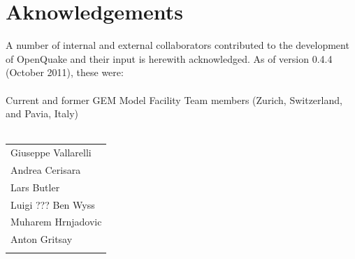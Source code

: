\chapter*{Aknowledgements}
A number of internal and external collaborators contributed to 
the development of OpenQuake and their input is herewith acknowledged. 
As of version 0.4.4 (October 2011), these were: \hfill \\
\hfill \\
Current and former GEM Model Facility Team members (Zurich, Switzerland,
and Pavia, Italy) \hfill \\
\hfill \\
\begin{tabular}{l}
Giuseppe Vallarelli \\
Andrea Cerisara \\
Lars Butler \\

Luigi ???
Ben Wyss \\
Muharem Hrnjadovic \\
Anton Gritsay \\
%
\hfill \\
\end{tabular}

